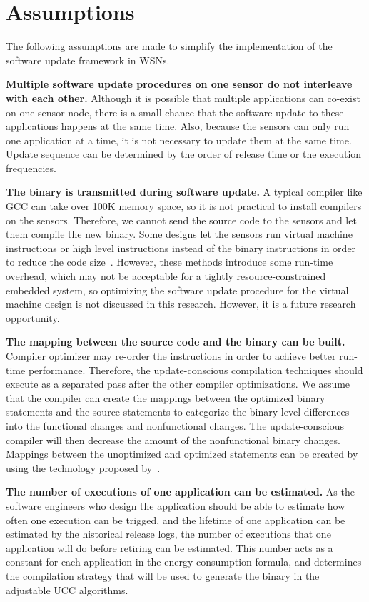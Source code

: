 \section{Assumptions}
The following assumptions are made to simplify the implementation of the software update framework in WSNs.

\textbf{Multiple software update procedures on one sensor do not interleave with each other.}
Although it is possible that multiple applications can co-exist on one sensor node, there is a small chance that the software update to these applications happens at the same time.
Also, because the sensors can only run one application at a time, it is not necessary to update them at the same time.
Update sequence can be determined by the order of release time or the execution frequencies.

\textbf{The binary is transmitted during software update.}
A typical compiler like GCC can take over 100K memory space, so it is not practical to install compilers on the sensors.
Therefore, we cannot send the source code to the sensors and let them compile the new binary.
Some designs let the sensors run virtual machine instructions or high level instructions instead of the binary instructions in order to reduce the code size~\cite{mate,related:dynamic1, related:dynamic2}. However, these methods introduce some run-time overhead, which may not be acceptable for a tightly resource-constrained embedded system, so optimizing the software update procedure for the virtual machine design is not discussed in this research. However, it is a future research opportunity.

\textbf{The mapping between the source code and the binary can be built.} Compiler optimizer may re-order the instructions in order to achieve better run-time performance. Therefore, the update-conscious compilation techniques should execute as a separated pass after the other compiler optimizations. 
We assume that the compiler can create the mappings between the optimized binary statements and the source statements to categorize the binary level differences into the functional changes and nonfunctional changes.
The update-conscious compiler will then decrease the amount of the nonfunctional binary changes.
Mappings between the unoptimized and optimized statements can be created by using the technology proposed by~\cite{mapping}.


\textbf{The number of executions of one application can be estimated.}
As the software engineers who design the application should be able to estimate how often one execution can be trigged, and the lifetime of one application can be estimated by the historical release logs, the number of executions that one application will do before retiring can be estimated. This number acts as a constant for each application in the energy consumption formula, and determines the compilation strategy that will be used to generate the binary in the adjustable UCC algorithms.

